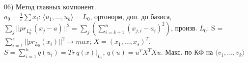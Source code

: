06) Метод главных компонент.\\
$a_0=\frac{1}{s}\sum x_i$: $\langle u_1,\dots,u_k\rangle= L_0$, ортонорм, доп. до базиса, $\sum\limits_j||pr_{L_0^{\perp}}(x_j-a)||^2 = \sum\limits_j(\sum\limits_{i = k + 1}^n (x_{j, i} - a_i)^2)$, произв. $L_0$: S = $\sum\limits_{i = 1}^s ||pr_{L_0}(x_i)||^2 \to max$; $X=(x_1,\dots,x_s)^T$. $S = \sum\limits_{i = 1}^k q(u_i) = Tr\, q(x)|_{L_0}$, $q(u) = u^TX^TXu$. Макс. по КФ на $\langle v_1,\dots,v_k\rangle$

